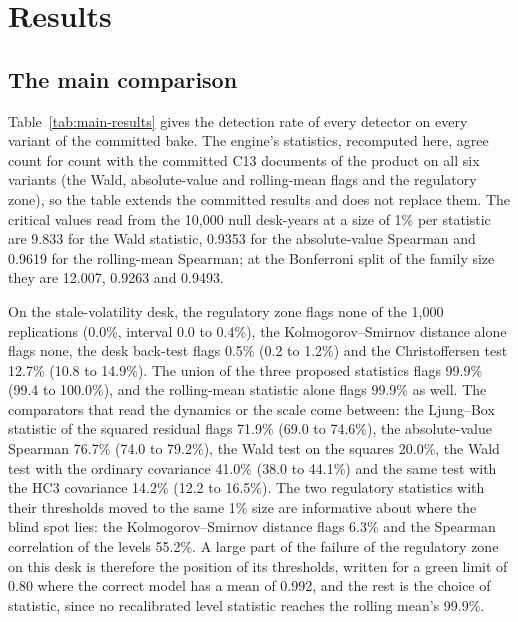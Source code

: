 \section{Results}
\label{sec:results}

\subsection{The main comparison}
\label{sec:results-main}

Table~\ref{tab:main-results} gives the detection rate of every detector on every variant of the committed bake.
The engine's statistics, recomputed here, agree count for count with the committed C13 documents of the product on all six variants (the Wald, absolute-value and rolling-mean flags and the regulatory zone), so the table extends the committed results and does not replace them.
The critical values read from the 10,000 null desk-years at a size of 1\% per statistic are 9.833 for the Wald statistic, 0.9353 for the absolute-value Spearman and 0.9619 for the rolling-mean Spearman; at the Bonferroni split of the family size they are 12.007, 0.9263 and 0.9493.



On the stale-volatility desk, the regulatory zone flags none of the 1,000 replications (0.0\%, interval 0.0 to 0.4\%), the Kolmogorov--Smirnov distance alone flags none, the desk back-test flags 0.5\% (0.2 to 1.2\%) and the Christoffersen test 12.7\% (10.8 to 14.9\%).
The union of the three proposed statistics flags 99.9\% (99.4 to 100.0\%), and the rolling-mean statistic alone flags 99.9\% as well.
The comparators that read the dynamics or the scale come between: the Ljung--Box statistic of the squared residual flags 71.9\% (69.0 to 74.6\%), the absolute-value Spearman 76.7\% (74.0 to 79.2\%), the Wald test on the squares 20.0\%, the Wald test with the ordinary covariance 41.0\% (38.0 to 44.1\%) and the same test with the HC3 covariance 14.2\% (12.2 to 16.5\%).
The two regulatory statistics with their thresholds moved to the same 1\% size are informative about where the blind spot lies: the Kolmogorov--Smirnov distance flags 6.3\% and the Spearman correlation of the levels 55.2\%.
A large part of the failure of the regulatory zone on this desk is therefore the position of its thresholds, written for a green limit of 0.80 where the correct model has a mean of 0.992, and the rest is the choice of statistic, since no recalibrated level statistic reaches the rolling mean's 99.9\%.

